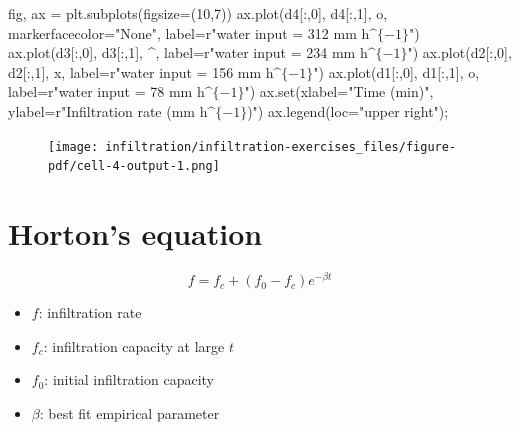 \documentclass[
  letterpaper,
  DIV=11,
  numbers=noendperiod]{scrreprt}
\newenvironment{Shaded}{\begin{snugshade}}{\end{snugshade}}
\newcommand{\BuiltInTok}[1]{\textcolor[rgb]{0.00,0.23,0.31}{#1}}
\newcommand{\DecValTok}[1]{\textcolor[rgb]{0.68,0.00,0.00}{#1}}
\newcommand{\NormalTok}[1]{\textcolor[rgb]{0.00,0.23,0.31}{#1}}
\newcommand{\OperatorTok}[1]{\textcolor[rgb]{0.37,0.37,0.37}{#1}}
\newcommand{\StringTok}[1]{\textcolor[rgb]{0.13,0.47,0.30}{#1}}
\newcommand{\VerbatimStringTok}[1]{\textcolor[rgb]{0.13,0.47,0.30}{#1}}
\providecommand{\tightlist}{%
  \setlength{\itemsep}{0pt}\setlength{\parskip}{0pt}}\usepackage{longtable,booktabs,array}
\begin{document}
\begin{Shaded}
\begin{Highlighting}[]
\NormalTok{fig, ax }\OperatorTok{=}\NormalTok{ plt.subplots(figsize}\OperatorTok{=}\NormalTok{(}\DecValTok{10}\NormalTok{,}\DecValTok{7}\NormalTok{))}
\NormalTok{ax.plot(d4[:,}\DecValTok{0}\NormalTok{], d4[:,}\DecValTok{1}\NormalTok{], }\StringTok{\textquotesingle{}o\textquotesingle{}}\NormalTok{, markerfacecolor}\OperatorTok{=}\StringTok{"None"}\NormalTok{, label}\OperatorTok{=}\VerbatimStringTok{r"water input = 312 mm h$\^{}\{{-}1\}$"}\NormalTok{)}
\NormalTok{ax.plot(d3[:,}\DecValTok{0}\NormalTok{], d3[:,}\DecValTok{1}\NormalTok{], }\StringTok{\textquotesingle{}\^{}\textquotesingle{}}\NormalTok{, label}\OperatorTok{=}\VerbatimStringTok{r"water input = 234 mm h$\^{}\{{-}1\}$"}\NormalTok{)}
\NormalTok{ax.plot(d2[:,}\DecValTok{0}\NormalTok{], d2[:,}\DecValTok{1}\NormalTok{], }\StringTok{\textquotesingle{}x\textquotesingle{}}\NormalTok{, label}\OperatorTok{=}\VerbatimStringTok{r"water input = 156 mm h$\^{}\{{-}1\}$"}\NormalTok{)}
\NormalTok{ax.plot(d1[:,}\DecValTok{0}\NormalTok{], d1[:,}\DecValTok{1}\NormalTok{], }\StringTok{\textquotesingle{}o\textquotesingle{}}\NormalTok{, label}\OperatorTok{=}\VerbatimStringTok{r"water input = 78 mm h$\^{}\{{-}1\}$"}\NormalTok{)}
\NormalTok{ax.}\BuiltInTok{set}\NormalTok{(xlabel}\OperatorTok{=}\StringTok{"Time (min)"}\NormalTok{,}
\NormalTok{       ylabel}\OperatorTok{=}\VerbatimStringTok{r"Infiltration rate (mm h$\^{}\{{-}1\}$)"}\NormalTok{)}
\NormalTok{ax.legend(loc}\OperatorTok{=}\StringTok{"upper right"}\NormalTok{)}\OperatorTok{;}
\end{Highlighting}
\end{Shaded}

\begin{figure}[H]

{\centering \texttt{[image: infiltration/infiltration-exercises\_files/figure-pdf/cell-4-output-1.png]}

}

\end{figure}

\hypertarget{hortons-equation}{%
\section{Horton's equation}\label{hortons-equation}}

\[
f = f_c+(f_0-f_c)e^{-\beta t}
\]

\begin{itemize}
\tightlist
\item
  \(f\): infiltration rate
\item
  \(f_c\): infiltration capacity at large \(t\)
\item
  \(f_0\): initial infiltration capacity
\item
  \(\beta\): best fit empirical parameter
\end{itemize}
\end{document}
